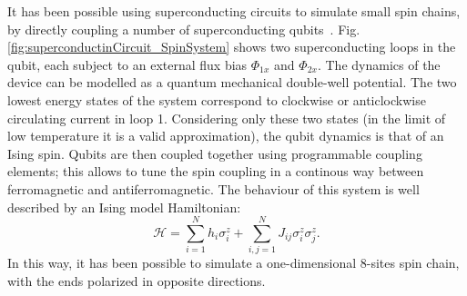 It has been possible using superconducting circuits to simulate small spin chains, by directly coupling a number of superconducting qubits~\cite{8spinChain_simulatedByQubits}. Fig.\ref{fig:superconductinCircuit_SpinSystem} shows two superconducting loops in the qubit, each subject to an external flux bias $\Phi_{1x}$ and $\Phi_{2x}$. The dynamics of the device can be modelled as a quantum mechanical double-well potential. The two lowest energy states of the system correspond to clockwise or anticlockwise circulating current in loop 1. Considering only these two states (in the limit of low temperature it is a valid approximation), the qubit dynamics is that of an Ising spin. Qubits are then coupled together using programmable coupling elements; this allows to tune the spin coupling in a continous way between ferromagnetic and antiferromagnetic. The behaviour of this system is well described by an Ising model Hamiltonian:
\begin{equation*}
    \mathcal{H} = \sum_{i=1}^{N} h_i\sigma_i^z + \sum_{i,j=1}^{N} J_{ij}\sigma_i^z\sigma_j^z.
\end{equation*}
In this way, it has been possible to simulate a one-dimensional 8-sites spin chain, with the ends polarized in opposite directions.